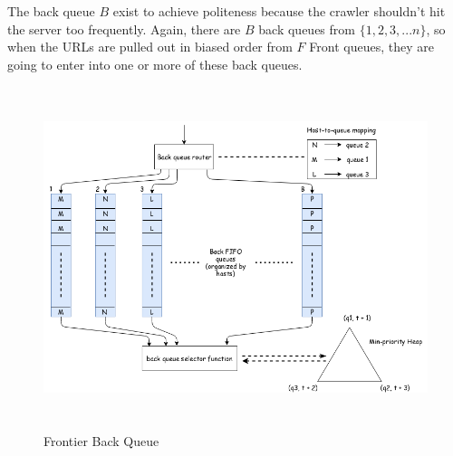 \pagebreak

\noindent
The back queue $B$ exist to achieve politeness because the crawler shouldn't hit the server too frequently.
Again, there are $B$ back queues from $\{1,2,3,...n\}$, so when the URLs are pulled out in biased order from $F$ Front queues, they are going to enter into one or more of these back queues. 

\begin{figure}[h!]
  \centering
  \includegraphics[width=13cm,height=10cm,keepaspectratio]{../media/crawler/b-queue.png}
  \caption{Frontier Back Queue}
  \label{fig:bqueue}
\end{figure}

